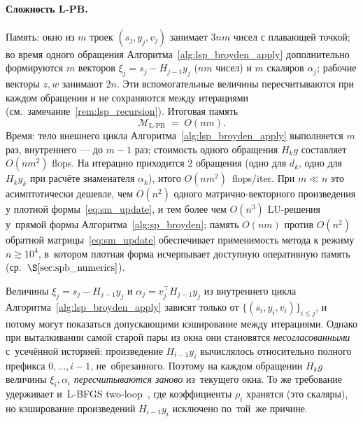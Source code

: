 \paragraph{Сложность L-PB.} Память: окно из $m$ троек
$(s_j, y_j, v_j)$ занимает $3nm$ чисел с плавающей точкой; во время
одного обращения Алгоритма~\ref{alg:lsp_broyden_apply} дополнительно
формируются $m$ векторов $\xi_j = s_j - H_{j-1} y_j$ ($nm$ чисел) и
$m$ скаляров $\alpha_j$; рабочие векторы $z,w$ занимают $2n$. Эти
вспомогательные величины пересчитываются при каждом обращении и
не сохраняются между итерациями (см.\ замечание~\ref{rem:lsp_recursion}).
Итоговая память
\begin{equation}\label{eq:lsp_memory}
   \mathcal M_{\text{L-PB}} \;=\; O(nm).
\end{equation}
Время: тело внешнего цикла Алгоритма~\ref{alg:lsp_broyden_apply}
выполняется $m$ раз, внутреннего --- до $m-1$ раз; стоимость одного
обращения $H_k g$ составляет $O(nm^2)$ flops. На итерацию приходится
2 обращения (одно для $d_k$, одно для $H_k y_k$ при расчёте знаменателя
$\alpha_k$), итого $O(nm^2)$~flops/iter. При $m\ll n$ это асимптотически
дешевле, чем $O(n^2)$ одного матрично-векторного произведения у плотной
формы~\eqref{eq:sm_update}, и тем более чем $O(n^3)$ LU-решения у~прямой
формы Алгоритма~\ref{alg:sp_broyden}; память $O(nm)$ против $O(n^2)$
обратной матрицы~\eqref{eq:sm_update} обеспечивает применимость метода
к режиму $n\gtrsim 10^4$, в~котором плотная форма исчерпывает доступную
оперативную память (ср.~$\S\ref{sec:spb_numerics}$).

\begin{remark}\label{rem:lsp_recursion}
Величины $\xi_j = s_j - H_{j-1} y_j$ и $\alpha_j = v_j^{\top} H_{j-1} y_j$
из внутреннего цикла Алгоритма~\ref{alg:lsp_broyden_apply} зависят
только от $\{(s_i,y_i,v_i)\}_{i\le j}$, и потому могут показаться
допускающими кэширование между итерациями. Однако при выталкивании
самой старой пары из окна они становятся \emph{несогласованными}
с~усечённой историей: произведение $H_{i-1} y_i$ вычислялось
относительно полного префикса $0,\ldots,i-1$, не~обрезанного. Поэтому
на каждом обращении $H_k g$ величины $\xi_i, \alpha_i$
\emph{пересчитываются заново} из~текущего окна. То же требование
удерживает и~L-BFGS two-loop~\cite[\S 7.2]{bfgs}, где коэффициенты
$\rho_i$ хранятся (это скаляры), но кэширование произведений
$H_{i-1} y_i$ исключено по~той~же причине.
\end{remark}


